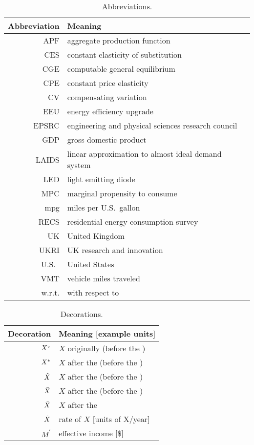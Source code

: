 \begin{table}
\centering %
\caption{Abbreviations.}
\begin{tabular}{r l}
  \toprule
  Abbreviation & Meaning \\
  \midrule
  APF    & aggregate production function \\
  CES    & constant elasticity of substitution \\
  CGE    & computable general equilibrium \\
  CPE    & constant price elasticity \\
  CV     & compensating variation \\
  EEU    & energy efficiency upgrade \\
  EPSRC  & engineering and physical sciences research council \\
  GDP    & gross domestic product \\
  LAIDS  & linear approximation to almost ideal demand system \\
  LED    & light emitting diode \\
  MPC    & marginal propensity to consume \\
  mpg    & miles per U.S.\ gallon \\
  RECS   & residential energy consumption survey \\
  UK     & United Kingdom \\
  UKRI   & UK research and innovation \\
  U.S.\  & United States \\
  VMT    & vehicle miles traveled \\
  w.r.t. & with respect to \\
  \bottomrule
\end{tabular}
\label{tab:abbreviations}
\end{table}



\begin{table}
\centering %
\caption{Decorations.}
\begin{tabular}{r l}
  \toprule
  Decoration & Meaning [example units] \\
  \midrule
  ${}{X}^{\scriptscriptstyle \circ}$ & $X$ originally (before the \empleffect{}) \\
  ${X}^*$  & $X$ after the \empleffect{} (before the \subeffect{}) \\
  $\hat{X}$ & $X$ after the \subeffect{} (before the \inceffect{}) \\
  $\bar{X}$ & $X$ after the \inceffect{} (before the \macroeffect{}) \\
  $\tilde{X}$ & $X$ after the \macroeffect{} \\
  $\dot{X}$ & rate of $X$ [units of X/year] \\
  $M^\prime$ & effective income [\$] \\
  \bottomrule
\end{tabular}
\label{tab:decorations}
\end{table}


